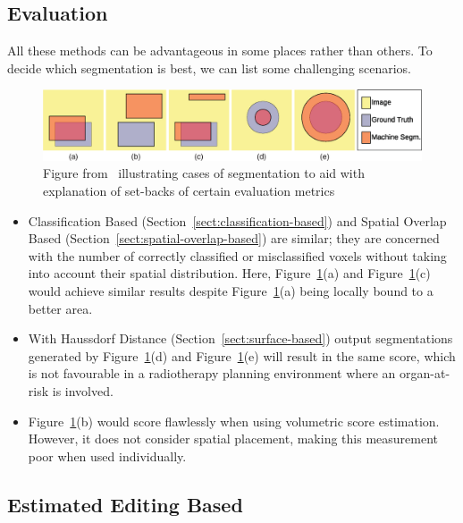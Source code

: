 \documentclass[12pt,twoside]{report}
\begin{document}
\subsection{Evaluation}\label{sect:evaluation-of-evaluation-methods}

All these methods can be advantageous in some places rather than others. To decide which segmentation is best, we can list some challenging scenarios.

\begin{figure}[H]
  \centering
  \includegraphics[width=\linewidth]{../figures/segmentation-cases-1.png}
  \caption{Figure from~\cite{boundary-overlap-metrics} illustrating cases of segmentation to aid with explanation of set-backs of certain evaluation metrics}\label{fig:segmentation-cases-1}
\end{figure}

\begin{itemize}
  \item Classification Based (Section~\ref{sect:classification-based}) and Spatial Overlap Based (Section~\ref{sect:spatial-overlap-based}) are similar; they are concerned with the number of correctly classified or misclassified voxels without taking into account their spatial distribution. Here, Figure~\ref{fig:segmentation-cases-1}(a) and Figure~\ref{fig:segmentation-cases-1}(c) would achieve similar results despite Figure~\ref{fig:segmentation-cases-1}(a) being locally bound to a better area.
  \item With Haussdorf Distance (Section~\ref{sect:surface-based}) output segmentations generated by Figure~\ref{fig:segmentation-cases-1}(d) and Figure~\ref{fig:segmentation-cases-1}(e) will result in the same score, which is not favourable in a radiotherapy planning environment where an organ-at-risk is involved.
  \item Figure~\ref{fig:segmentation-cases-1}(b) would score flawlessly when using volumetric score estimation. However, it does not consider spatial placement, making this measurement poor when used individually.
\end{itemize}

\subsection{Estimated Editing Based}\label{sect:surface-dice}
\end{document}
